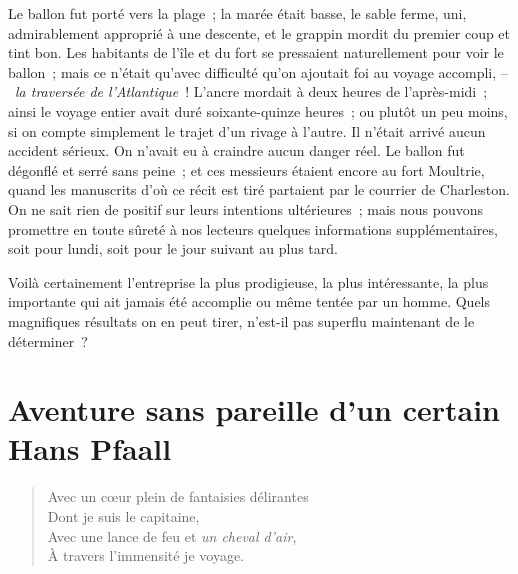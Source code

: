 \documentclass[french,twoside]{book} %
\begin{document}
Le ballon fut porté vers la plage ; la marée était basse, le sable ferme, uni, admirablement approprié à une descente, et le grappin mordit du premier coup et tint bon. Les habitants de l’île et du fort se pressaient naturellement pour voir le ballon ; mais ce n’était qu’avec difficulté qu’on ajoutait foi au voyage accompli, – \emph{la traversée de l’Atlantique} ! L’ancre mordait à deux heures de l’après-midi ; ainsi le voyage entier avait duré soixante-quinze heures ; ou plutôt un peu moins, si on compte simplement le trajet d’un rivage à l’autre. Il n’était arrivé aucun accident sérieux. On n’avait eu à craindre aucun danger réel. Le ballon fut dégonflé et serré sans peine ; et ces messieurs étaient encore au fort Moultrie, quand les manuscrits d’où ce récit est tiré partaient par le courrier de Charleston. On ne sait rien de positif sur leurs intentions ultérieures ; mais nous pouvons promettre en toute sûreté à nos lecteurs quelques informations supplémentaires, soit pour lundi, soit pour le jour suivant au plus tard.\par
Voilà certainement l’entreprise la plus prodigieuse, la plus intéressante, la plus importante qui ait jamais été accomplie ou même tentée par un homme. Quels magnifiques résultats on en peut tirer, n’est-il pas superflu maintenant de le déterminer ?
\section[{Aventure sans pareille d’un certain Hans Pfaall}]{Aventure sans pareille d’un certain Hans Pfaall}\renewcommand{\leftmark}{Aventure sans pareille d’un certain Hans Pfaall}


\begin{verse}
Avec un cœur plein de fantaisies délirantes\\
Dont je suis le capitaine,\\
Avec une lance de feu et \emph{un cheval d’air},\\
À travers l’immensité je voyage.\\
\end{verse}
\end{document}
